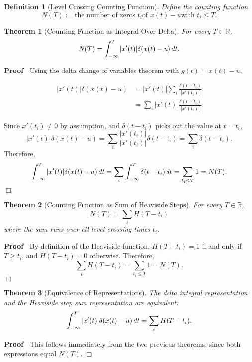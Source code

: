\documentclass{article}
\newcommand{\assign}{:=}
\newenvironment{proof}{\noindent\textbf{Proof\ }}{\hspace*{\fill}$\Box$\medskip}
\newtheorem{definition}{Definition}
\newtheorem{theorem}{Theorem}
\begin{document}
\begin{definition}
  [Level Crossing Counting Function] Define the counting function
  \[ N (T) \assign \text{the number of zeros } t_i  \text{of } x (t) - u
     \text{with } t_i \leq T. \]
\end{definition}

\begin{theorem}
  [Counting Function as Integral Over Delta] For every $T \in \mathbb{R}$,
  \[ N (T) = \int_{- \infty}^T |x' (t) | \delta (x (t) - u)  \hspace{0.17em}
     dt. \]
\end{theorem}

\begin{proof}
  Using the delta change of variables theorem with $g (t) = x (t) - u$,
  
  \begin{align}
    |x' (t) | \delta (x (t) - u) & = |x' (t) |  \sum_i \frac{\delta (t -
    t_i)}{|x' (t_i) |} \\
    & = \sum_i |x' (t) | \frac{\delta (t - t_i)}{|x' (t_i) |} 
  \end{align}
  
  Since $x' (t_i) \neq 0$ by assumption, and $\delta (t - t_i)$ picks out the
  value at $t = t_i$,
  \[ |x' (t) | \delta (x (t) - u) = \sum_i \frac{|x' (t_i) |}{|x' (t_i) |}
     \delta (t - t_i) = \sum_i \delta (t - t_i) . \]
  Therefore,
  \[ \int_{- \infty}^T |x' (t) | \delta (x (t) - u)  \hspace{0.17em} dt =
     \sum_i \int_{- \infty}^T \delta (t - t_i)  \hspace{0.17em} dt = \sum_{t_i
     \leq T} 1 = N (T) . \]
\end{proof}

\begin{theorem}
  [Counting Function as Sum of Heaviside Steps] For every $T \in \mathbb{R}$,
  \[ N (T) = \sum_i H (T - t_i) \]
  where the sum runs over all level crossing times $t_i$.
\end{theorem}

\begin{proof}
  By definition of the Heaviside function, $H (T - t_i) = 1$ if and only if $T
  \geq t_i$, and $H (T - t_i) = 0$ otherwise. Therefore,
  \[ \sum_i H (T - t_i) = \sum_{t_i \leq T} 1 = N (T) . \]
\end{proof}

\begin{theorem}
  [Equivalence of Representations] The delta integral representation and the
  Heaviside step sum representation are equivalent:
  \[ \int_{- \infty}^T |x' (t) | \delta (x (t) - u)  \hspace{0.17em} dt =
     \sum_i H (T - t_i) . \]
\end{theorem}

\begin{proof}
  This follows immediately from the two previous theorems, since both
  expressions equal $N (T)$.
\end{proof}
\end{document}
